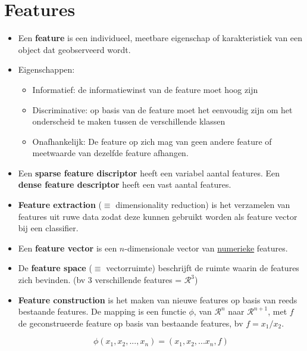 \section{Features}
\begin{itemize}
	\item Een \textbf{feature} is een individueel, meetbare eigenschap of karakteristiek van een object dat geobserveerd wordt.
	\item Eigenschappen:
	\begin{itemize}
		\item Informatief: de informatiewinst van de feature moet hoog zijn
		\item Discriminative: op basis van de feature moet het eenvoudig zijn om het onderscheid te maken tussen de verschillende klassen
		\item Onafhankelijk: De feature op zich mag van geen andere feature of meetwaarde van dezelfde feature afhangen.


	\end{itemize}
	\item Een \textbf{sparse feature discriptor} heeft een variabel aantal features. Een \textbf{dense feature descriptor} heeft een vast aantal features.
	\item \textbf{Feature extraction} ($\equiv$ dimensionality reduction) is het verzamelen van features uit ruwe data zodat deze kunnen gebruikt worden als feature vector bij een classifier. 
	\item Een \textbf{feature vector} is een $n$-dimensionale vector van \underline{numerieke} features.
	\item De \textbf{feature space} ($\equiv$ vectorruimte) beschrijft de ruimte waarin de features zich bevinden. (bv 3 verschillende features = $\mathcal{R}^3$)
	\item \textbf{Feature construction} is het maken van nieuwe features op basis van reeds bestaande features. De mapping is een functie $\phi$, van $\mathcal{R}^n$ naar $\mathcal{R}^{n + 1}$, met $f$ de geconstrueerde feature op basis van bestaande features, bv $f = x_1/x_2$.
	
	$$\phi(x_1, x_2, ..., x_n) = (x_1, x_2, ... x_n, f)$$

\end{itemize}
